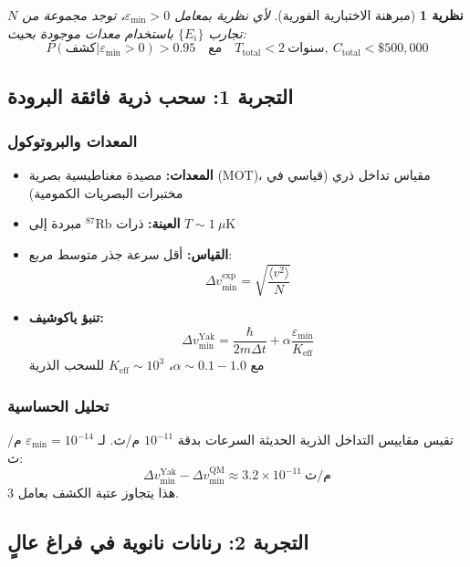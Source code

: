 \documentclass[11pt,a4paper]{article}
\newtheorem{theorem}{نظرية}
\begin{document}
	\begin{theorem}[مبرهنة الاختبارية الفورية]
		لأي نظرية بمعامل $\varepsilon_{\min} > 0$، توجد مجموعة من $N$ تجارب $\{E_i\}$ باستخدام معدات موجودة بحيث:
		\begin{equation}
			\boxed{P(\text{كشف}|\varepsilon_{\min} > 0) > 0.95 \quad \text{مع} \quad T_{\text{total}} < 2\ \text{سنوات}, \ C_{\text{total}} < \$500,000}
		\end{equation}
	\end{theorem}
	
	\subsection{التجربة 1: سحب ذرية فائقة البرودة}
	
	\subsubsection{المعدات والبروتوكول}
	\begin{itemize}
		\item \textbf{المعدات:} مصيدة مغناطيسية بصرية (MOT)، مقياس تداخل ذري (قياسي في مختبرات البصريات الكمومية)
		\item \textbf{العينة:} ذرات $^{87}\text{Rb}$ مبردة إلى $T \sim 1\ \mu\text{K}$
		\item \textbf{القياس:} أقل سرعة جذر متوسط مربع:
		\[
		\Delta v_{\min}^{\text{exp}} = \sqrt{\frac{\langle v^2 \rangle}{N}}
		\]
		\item \textbf{تنبؤ ياكوشيف:}
		\[
		\Delta v_{\min}^{\text{Yak}} = \frac{\hbar}{2m\Delta t} + \alpha \frac{\varepsilon_{\min}}{K_{\mathrm{eff}}}
		\]
		مع $\alpha \sim 0.1-1.0$، $K_{\mathrm{eff}} \sim 10^3$ للسحب الذرية
	\end{itemize}
	
	\subsubsection{تحليل الحساسية}
	
	تقيس مقاييس التداخل الذرية الحديثة السرعات بدقة $10^{-11}$ م/ث. لـ $\varepsilon_{\min} = 10^{-14}$ م/ث:
	\[
	\Delta v_{\min}^{\text{Yak}} - \Delta v_{\min}^{\text{QM}} \approx 3.2 \times 10^{-11}\ \text{م/ث}
	\]
	هذا يتجاوز عتبة الكشف بعامل 3.
	
	\subsection{التجربة 2: رنانات نانوية في فراغ عالٍ}
	
\end{document}
